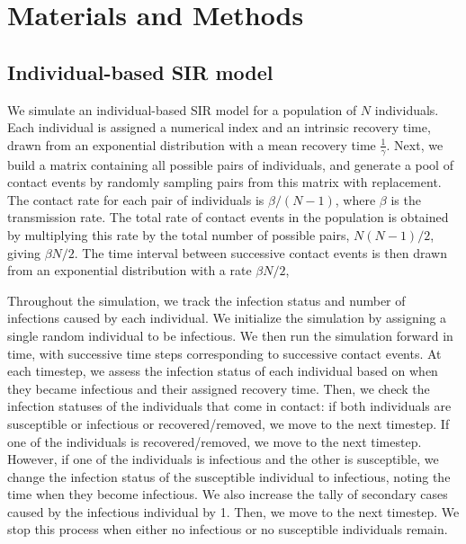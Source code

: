 \section{Materials and Methods}

\subsection{Individual-based SIR model} \label{subsec_ibm}
We simulate an individual-based SIR model for a population of $N$ individuals. Each individual is assigned a numerical index and an intrinsic recovery time, drawn from an exponential distribution with a mean recovery time $\frac{1}{\gamma}$. Next, we build a matrix containing all possible pairs of individuals, and generate a pool of contact events by randomly sampling pairs from this matrix with replacement. 
The contact rate for each pair of individuals is $\beta/(N-1)$,  where $\beta$ is the transmission rate. The total rate of contact events in the population is obtained by multiplying this rate by the total number of possible pairs, $N(N-1)/2$, giving $\beta N/2$.
The time interval between successive contact events is then drawn from an exponential distribution with a rate $\beta N/2$,

 Throughout the simulation, we track the infection status and number of infections caused by each individual. We initialize the simulation by assigning a single random individual to be infectious. We then run the simulation forward in time, with successive time steps corresponding to successive contact events. At each timestep, we assess the infection status of each individual based on when they became infectious and their assigned recovery time. Then, we check the infection statuses of the individuals that come in contact: if both individuals are susceptible or infectious or recovered/removed, we move to the next timestep. If one of the individuals is recovered/removed, we move to the next timestep. However, if one of the individuals is infectious and the other is susceptible, we change the infection status of the susceptible individual to infectious, noting the time when they become infectious. We also increase the tally of secondary cases caused by the infectious individual by 1. Then, we move to the next timestep. We stop this process when either no infectious or no susceptible individuals  remain. 

